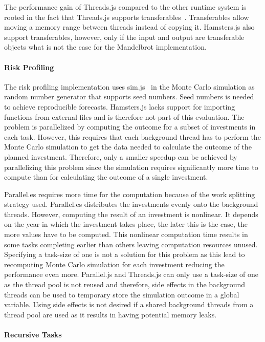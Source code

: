 The performance gain of Threads.js compared to the other runtime system is rooted in the fact that Threads.js supports transferables~\cite[Section 2.7.4]{w3cHtml5}. Transferables allow moving a memory range between threads instead of copying it. Hamsters.js also support transferables, however, only if the input and output are transferable objects what is not the case for the Mandelbrot implementation.

\paragraph{Risk Profiling}
The risk profiling implementation uses sim.js~\cite{simjs} in the Monte Carlo simulation as random number generator that supports seed numbers. Seed numbers is needed to achieve reproducible forecasts. Hamsters.js lacks support for importing functions from external files and is therefore not part of this evaluation. The problem is parallelized by computing the outcome for a subset of investments in each task. However, this requires that each background thread has to perform the Monte Carlo simulation to get the data needed to calculate the outcome of the planned investment. Therefore, only a smaller speedup can be achieved by parallelizing this problem since the simulation requires significantly more time to compute than for calculating the outcome of a single investment. 

Parallel.es requires more time for the computation because of the work splitting strategy used. Parallel.es distributes the investments evenly onto the background threads. However, computing the result of an investment is nonlinear. It depends on the year in which the investment takes place, the later this is the case, the more values have to be computed. This nonlinear computation time results in some tasks completing earlier than others leaving computation resources unused. Specifying a task-size of one is not a solution for this problem as this lead to recomputing Monte Carlo simulation for each investment reducing the performance even more. Parallel.js and Threads.js can only use a task-size of one as the thread pool is not reused and therefore, side effects in the background threads can be used to temporary store the simulation outcome in a global variable. Using side effects is not desired if a shared background threads from a thread pool are used as it results in having potential memory leaks.

\paragraph{Recursive Tasks} 


